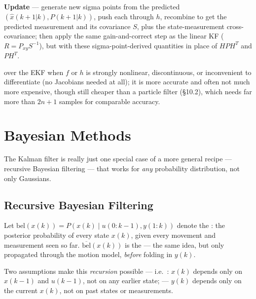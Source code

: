 \textbf{Update} --- generate new sigma points from the predicted $(\hat x(k{+}1|k),P(k{+}1|k))$, push each through $h$, recombine to get the predicted measurement and its covariance $S$, plus the state-measurement cross-covariance; then apply the same gain-and-correct step as the linear KF ($R=P_{xy}S^{-1}$), but with these sigma-point-derived quantities in place of $HPH^T$ and $PH^T$.

 over the EKF when $f$ or $h$ is strongly nonlinear, discontinuous, or inconvenient to differentiate (no Jacobians needed at all); it is more accurate and often not much more expensive, though still cheaper than a particle filter (\S10.2), which needs far more than $2n{+}1$ samples for comparable accuracy.

\section{Bayesian Methods}
The Kalman filter is really just one special case of a more general recipe --- recursive Bayesian filtering --- that works for \emph{any} probability distribution, not only Gaussians.

\subsection{Recursive Bayesian Filtering}
Let $\mathrm{bel}(x(k))=P(x(k)\mid u(0{:}k{-}1),y(1{:}k))$ denote the : the posterior probability of every state $x(k)$, given every movement and measurement seen so far. $\overline{\mathrm{bel}}(x(k))$ is the  --- the same idea, but only propagated through the motion model, \emph{before} folding in $y(k)$.

\begin{notebox}
Two assumptions make this \emph{recursion} possible --- i.e.\  : $x(k)$ depends only on $x(k{-}1)$ and $u(k{-}1)$, not on any earlier state;  --- $y(k)$ depends only on the current $x(k)$, not on past states or measurements.
\end{notebox}


